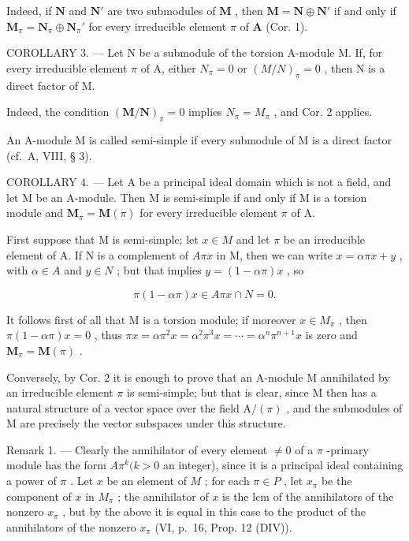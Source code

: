 Indeed, if \(\mathbf{N}\) and \(\mathbf{N}'\) are two submodules of \(\mathbf{M}\) , then \(\mathbf{M} = \mathbf{N} \oplus \mathbf{N}'\) if and only if \(\mathbf{M}_{\pi} = \mathbf{N}_{\pi} \oplus \mathbf{N}_{\pi}'\) for every irreducible element \(\pi\) of \(\mathbf{A}\) (Cor. 1).

COROLLARY 3. --- Let N be a submodule of the torsion A-module M. If, for every irreducible element \(\pi\) of A, either \(N_{\pi} = 0\) or \((M/N)_{\pi} = 0\) , then N is a direct factor of M.

Indeed, the condition \((\mathbf{M}/\mathbf{N})_{\pi}=0\) implies \(N_{\pi}=M_{\pi}\) , and Cor. 2 applies.

An A-module M is called semi-simple if every submodule of M is a direct factor (cf.~A, VIII, § 3).

COROLLARY 4. --- Let A be a principal ideal domain which is not a field, and let M be an A-module. Then M is semi-simple if and only if M is a torsion module and \(\mathbf{M}_{\pi} = \mathbf{M}(\pi)\) for every irreducible element \(\pi\) of A.

First suppose that M is semi-simple; let \(x \in M\) and let \(\pi\) be an irreducible element of A. If N is a complement of \(A\pi x\) in M, then we can write \(x = \alpha\pi x + y\) , with \(\alpha \in A\) and \(y \in N\) ; but that implies \(y = (1 - \alpha\pi)x\) , so

\[
\pi (1 - \alpha \pi) x \in A \pi x \cap N = 0.
\]

It follows first of all that M is a torsion module; if moreover \(x \in M_{\pi}\) , then \(\pi(1 - \alpha\pi)x = 0\) , thus \(\pi x = \alpha\pi^{2}x = \alpha^{2}\pi^{3}x = \cdots = \alpha^{n}\pi^{n+1}x\) is zero and \(\mathbf{M}_{\pi} = \mathbf{M}(\pi)\) .

Conversely, by Cor. 2 it is enough to prove that an A-module M annihilated by an irreducible element \(\pi\) is semi-simple; but that is clear, since M then has a natural structure of a vector space over the field \(\mathrm{A}/(\pi)\) , and the submodules of M are precisely the vector subspaces under this structure.

Remark 1. --- Clearly the annihilator of every element \(\neq 0\) of a \(\pi\) -primary module has the form \(A\pi^k (k > 0\) an integer), since it is a principal ideal containing a power of \(\pi\) . Let \(x\) be an element of \(M\) ; for each \(\pi \in P\) , let \(x_{\pi}\) be the component of \(x\) in \(M_{\pi}\) ; the annihilator of \(x\) is the lcm of the annihilators of the nonzero \(x_{\pi}\) , but by the above it is equal in this case to the product of the annihilators of the nonzero \(x_{\pi}\) (VI, p.~16, Prop. 12 (DIV)).


